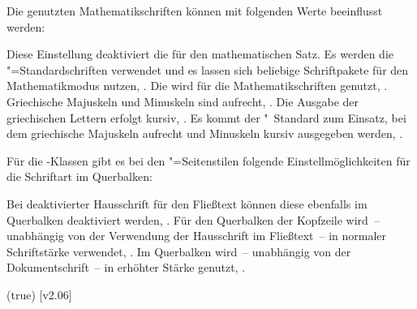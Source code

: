 \begin{DeclareEntity*}{}
\begin{DeclareEntity*}{}
\begin{DeclareEntity*}{}
\begin{Declaration}
Die genutzten Mathematikschriften können mit folgenden Werte beeinflusst werden:
\begin{DeclareValues}
  Diese Einstellung deaktiviert die \OpenSans für den mathematischen Satz. Es 
  werden die "=Standardschriften verwendet und es lassen sich  
  beliebige Schriftpakete für den Mathematikmodus nutzen, 
  .
  Die \OpenSans wird für die Mathematikschriften genutzt, 
  .
  Griechische Majuskeln und Minuskeln sind aufrecht, 
  .
  Die Ausgabe der griechischen Lettern erfolgt kursiv, 
  .
  Es kommt der "~Standard zum Einsatz, bei dem griechische 
  Majuskeln aufrecht und Minuskeln kursiv ausgegeben werden, 
  .
\end{DeclareValues}

%
Für die \TUDScript-Klassen gibt es bei den "=Seitenstilen
folgende Einstellmöglichkeiten für die Schriftart im Querbalken:
\begin{DeclareValues}
  Bei deaktivierter Hausschrift für den Fließtext können diese ebenfalls im 
  Querbalken deaktiviert werden, .
  Für den Querbalken der Kopfzeile wird~-- unabhängig von der Verwendung der 
  Hausschrift im Fließtext~-- \OpenSans in normaler Schriftstärke verwendet, 
  .
  Im Querbalken wird~-- unabhängig von der Dokumentschrift~-- \OpenSans in 
  erhöhter Stärke genutzt, .
\end{DeclareValues}
\end{Declaration}

\begin{Declaration}
  {}
  (true)
  [v2.06]
\printdeclarationlist


\end{Declaration}
\end{DeclareEntity*}
\end{DeclareEntity*}
\end{DeclareEntity*}
